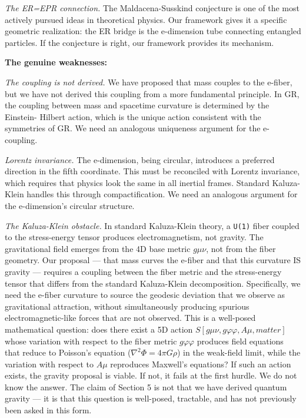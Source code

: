 \documentclass[aps,prd,preprint,superscriptaddress,longbibliography,floatfix]{revtex4-2}
\theoremstyle{remark}
\begin{document}
\textit{The ER=EPR connection.} The Maldacena-Susskind conjecture is one of the most actively pursued ideas in theoretical physics. Our framework gives it a specific geometric realization: the ER bridge is the e-dimension tube connecting entangled particles. If the conjecture is right, our framework provides its mechanism.

\textbf{The genuine weaknesses:}

\textit{The coupling is not derived.} We have proposed that mass couples to the e-fiber, but we have not derived this coupling from a more fundamental principle. In GR, the coupling between mass and spacetime curvature is determined by the Einstein- Hilbert action, which is the unique action consistent with the symmetries of GR. We need an analogous uniqueness argument for the e-coupling.

\textit{Lorentz invariance.} The e-dimension, being circular, introduces a preferred direction in the fifth coordinate. This must be reconciled with Lorentz invariance, which requires that physics look the same in all inertial frames. Standard Kaluza- Klein handles this through compactification. We need an analogous argument for the e-dimension's circular structure.

\textit{The Kaluza-Klein obstacle.} In standard Kaluza-Klein theory, a \texttt{U(1)} fiber coupled to the stress-energy tensor produces electromagnetism, not gravity. The gravitational field emerges from the 4D base metric $g\mu\nu$, not from the fiber geometry. Our proposal --- that mass curves the e-fiber and that this curvature IS gravity --- requires a coupling between the fiber metric and the stress-energy tensor that differs from the standard Kaluza-Klein decomposition. Specifically, we need the e-fiber curvature to source the geodesic deviation that we observe as gravitational attraction, without simultaneously producing spurious electromagnetic-like forces that are not observed. This is a well-posed mathematical question: does there exist a 5D action $S[g\mu\nu, g\varphi\varphi, A\mu, matter]$ whose variation with respect to the fiber metric $g\varphi\varphi$ produces field equations that reduce to Poisson's equation ($\nabla^{2}\Phi = 4\pi G\rho$) in the weak-field limit, while the variation with respect to $A\mu$ reproduces Maxwell's equations? If such an action exists, the gravity proposal is viable. If not, it fails at the first hurdle. We do not know the answer. The claim of Section 5 is not that we have derived quantum gravity --- it is that this question is well-posed, tractable, and has not previously been asked in this form.
\end{document}
